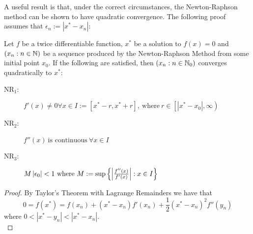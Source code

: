 \begin{Uniform Convergence Thm}
A useful result is that, under the correct circumstances, the Newton-Raphson method can be shown to have quadratic convergence. The following proof assumes that \(\epsilon_n := |x^\ast - x_n|\):

\begin{Quad Convergence of Newton}
\label{THM_"Quad Conv Newton"}
Let \(f\) be a twice differentiable function, \(x^\ast\) be a solution to \(f(x) = 0\) and \((x_n : n \in \mathbb{N})\) be a sequence produced by the Newton-Raphson Method from some initial point \(x_0\). If the following are satisfied, then \((x_n : n \in \mathbb{N}_0)\) converges quadratically to \(x^\ast\):
\begin{description}

\item[\(\textrm{NR}_1\):]
\begin{math}
	f'(x) \neq 0 \forall x \in I := [x^\ast - r, x^\ast + r], \ \mathrm{where}\ r \in \left[\left|x^\ast - x_0\right|, \infty\right)
\end{math}

\item[\(\textrm{NR}_2\):]
\begin{math}
	f''(x) \ \textrm{is continuous}\  \forall x \in I
\end{math}

\item[\(\textrm{NR}_3\):]
\begin{math}
	M\left|\epsilon_0\right| < 1 \ \mathrm{where}\ M := \sup\left\{\left|\frac{f''(x)}{f'(x)}\right| : x \in I\right\}\\
\end{math}
\end{description}
\end{Quad Convergence of Newton}

\begin{proof}
By Taylor's Theorem with Lagrange Remainders we have that
\begin{displaymath}
	0 = f(x^\ast) = f(x_n) + (x^\ast - x_n)f'(x_n) + \frac{1}{2}
		(x^\ast - x_n)^2f''(y_n)
\end{displaymath}
where \(0 < |x^\ast - y_n| < |x^\ast - x_n|\).\\


\end{proof}
\end{Uniform Convergence Thm}
